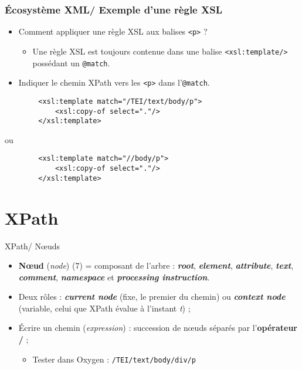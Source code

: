 \documentclass{beamer}
\begin{document}
    \begin{frame}[fragile]
   \frametitle{Écosystème XML/ Exemple d'une règle XSL}
        \begin{itemize}
            \item Comment appliquer une règle XSL aux balises \texttt{<p>} ?
            \begin{itemize}
                \item Une règle XSL est toujours contenue dans une balise \texttt{<xsl:template/>} possédant un \texttt{@match}.
            \end{itemize}
            \item Indiquer le chemin XPath vers les \texttt{<p>} dans  l'\texttt{@match}.
        \end{itemize}
        \bigskip
        \begin{verbatim}
        <xsl:template match="/TEI/text/body/p">
            <xsl:copy-of select="."/>
        </xsl:template>
        \end{verbatim}
        ou
        \begin{verbatim}
        <xsl:template match="//body/p">
            <xsl:copy-of select="."/>
        </xsl:template>
        \end{verbatim}
   \end{frame}

    \section{XPath}
    
    \begin{frame}{XPath/ N\oe uds}
        \Large
        \begin{itemize}
            \item \textbf{N\oe ud} (\textit{node}) (7) = composant de l'arbre : \textit{\textbf{root}}, \textbf{\textit{element}}, \textbf{\textit{attribute}}, \textbf{\textit{text}}, \textit{\textbf{comment}}, \textit{\textbf{namespace}} et \textit{\textbf{processing instruction}}.
            \bigskip
            \item Deux rôles : \textbf{\textit{current node}} (fixe, le premier du chemin) ou \textbf{\textit{context node}} (variable, celui que XPath évalue à l'instant \textit{t}) ;
            \bigskip
            \item Écrire un chemin (\textit{expression}) : succession de n\oe uds séparés par l'\textbf{opérateur /} ;
            \begin{itemize}
            \Large
                \item Tester dans Oxygen : \texttt{/TEI/text/body/div/p}
            \end{itemize}
        \end{itemize}
        
    \end{frame}
\end{document}
